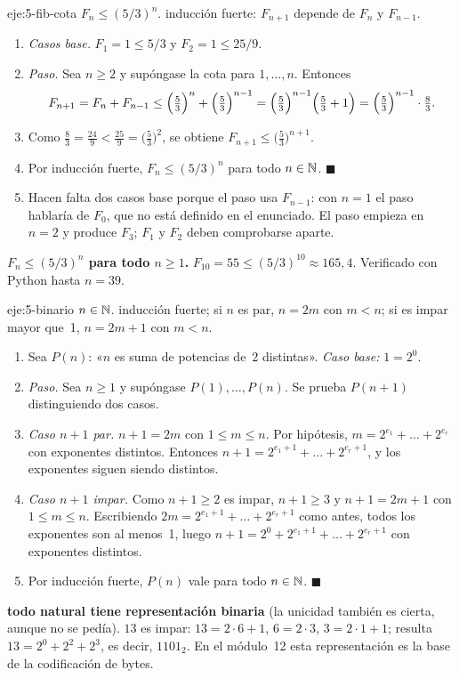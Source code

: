 \begin{solucion}{eje:5-fib-cota}
\datos $F_n\le(5/3)^{n}$.
\planteamiento inducción fuerte: $F_{n+1}$ depende de $F_n$ y $F_{n-1}$.
\pasos
\begin{enumerate}[label=\arabic*.]
  \item \emph{Casos base.} $F_1=1\le 5/3$ y $F_2=1\le 25/9$.
  \item \emph{Paso.} Sea $n\ge 2$ y supóngase la cota para $1,\dots,n$. Entonces
  \[
  F_{n+1}=F_n+F_{n-1}\le\Bigl(\tfrac53\Bigr)^{n}+\Bigl(\tfrac53\Bigr)^{n-1}=\Bigl(\tfrac53\Bigr)^{n-1}\Bigl(\tfrac53+1\Bigr)=\Bigl(\tfrac53\Bigr)^{n-1}\cdot\tfrac83.
  \]
  \item Como $\frac83=\frac{24}{9}<\frac{25}{9}=\bigl(\frac53\bigr)^{2}$, se obtiene $F_{n+1}\le\bigl(\frac53\bigr)^{n+1}$.
  \item Por inducción fuerte, $F_n\le(5/3)^{n}$ para todo $n\in\mathbb{N}$. $\blacksquare$
  \item Hacen falta dos casos base porque el paso usa $F_{n-1}$: con $n=1$ el paso hablaría de $F_0$, que no está definido en el enunciado. El paso empieza en $n=2$ y produce $F_3$; $F_1$ y $F_2$ deben comprobarse aparte.
\end{enumerate}
\resultado \textbf{$F_n\le(5/3)^{n}$ para todo $n\ge 1$.}
\comprobacion $F_{10}=55\le(5/3)^{10}\approx 165{,}4$. Verificado con Python hasta $n=39$.
\end{solucion}

\begin{solucion}{eje:5-binario}
\datos $n\in\mathbb{N}$.
\planteamiento inducción fuerte; si $n$ es par, $n=2m$ con $m<n$; si es impar mayor que~1, $n=2m+1$ con $m<n$.
\pasos
\begin{enumerate}[label=\arabic*.]
  \item Sea $P(n)$: «$n$ es suma de potencias de~2 distintas». \emph{Caso base:} $1=2^{0}$.
  \item \emph{Paso.} Sea $n\ge 1$ y supóngase $P(1),\dots,P(n)$. Se prueba $P(n+1)$ distinguiendo dos casos.
  \item \emph{Caso $n+1$ par.} $n+1=2m$ con $1\le m\le n$. Por hipótesis, $m=2^{e_1}+\dots+2^{e_r}$ con exponentes distintos. Entonces $n+1=2^{e_1+1}+\dots+2^{e_r+1}$, y los exponentes siguen siendo distintos.
  \item \emph{Caso $n+1$ impar.} Como $n+1\ge 2$ es impar, $n+1\ge 3$ y $n+1=2m+1$ con $1\le m\le n$. Escribiendo $2m=2^{e_1+1}+\dots+2^{e_r+1}$ como antes, todos los exponentes son al menos~1, luego $n+1=2^{0}+2^{e_1+1}+\dots+2^{e_r+1}$ con exponentes distintos.
  \item Por inducción fuerte, $P(n)$ vale para todo $n\in\mathbb{N}$. $\blacksquare$
\end{enumerate}
\resultado \textbf{todo natural tiene representación binaria} (la unicidad también es cierta, aunque no se pedía).
\comprobacion $13$ es impar: $13=2\cdot 6+1$, $6=2\cdot 3$, $3=2\cdot 1+1$; resulta $13=2^{0}+2^{2}+2^{3}$, es decir, $1101_2$. En el módulo~12 esta representación es la base de la codificación de bytes.
\end{solucion}

